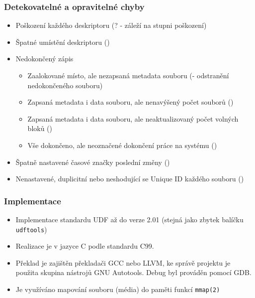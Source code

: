 \documentclass[aspectratio=169]{beamer}
\newcommand{\cmark}{\ding{51}}%
\begin{document}
		\begin{frame}
			\frametitle{Detekovatelné a opravitelné chyby}
			\vspace{40 pt}
            \begin{itemize}
                \Large\item Poškození každého deskriptoru (? - záleží na stupni poškození)
                \Large\item Špatné umístění deskriptoru (\cmark)
                \Large\item Nedokončený zápis 
                    \begin{itemize}
                        \large\item Zaalokované místo, ale nezapsaná metadata souboru (\cmark - odstranění nedokončeného souboru)
                        \large\item Zapsaná metadata i data souboru, ale nenavýšený počet souborů (\cmark)
                        \large\item Zapsaná metadata i data souboru, ale neaktualizovaný počet volných bloků (\cmark)
                        \large\item Vše dokončeno, ale neoznačené dokončení práce na systému (\cmark)
                    \end{itemize}
                \Large\item Špatně nastavené časové značky poslední změny (\cmark)
                \Large\item Nenastavené, duplicitní nebo neshodující se Unique ID každého souboru (\cmark)
            \end{itemize}
		\end{frame}
		\begin{frame}
			\frametitle{Implementace} %
			\vspace{40 pt}
		    \begin{itemize}
                \Large\item Implementace standardu UDF až do verze 2.01 (stejná jako zbytek balíčku \texttt{udftools})
                \Large\item Realizace je v jazyce C podle standardu C99.
                \Large\item Překlad je zajištěn překladači GCC nebo LLVM, ke správě projektu je použita skupina nástrojů GNU Autotools. Debug byl prováděn pomocí GDB.
                \Large\item Je využíváno mapování souboru (média) do paměti funkcí \texttt{mmap(2)}
            \end{itemize}
		\end{frame}
\end{document}
